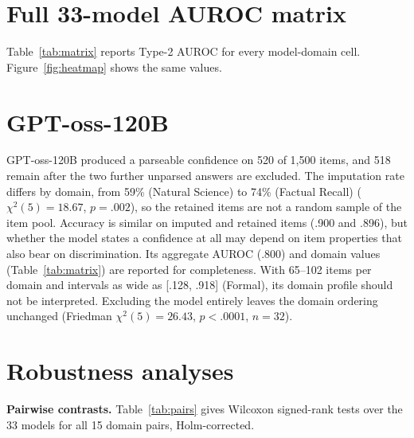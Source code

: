 \section{Full 33-model AUROC matrix}
\label{app:matrix}

Table~\ref{tab:matrix} reports Type-2 AUROC for every model-domain cell. Figure~\ref{fig:heatmap} shows the same values.



\section{GPT-oss-120B}
\label{app:gptoss}

GPT-oss-120B produced a parseable confidence on 520 of 1{,}500 items, and 518 remain after the two further unparsed answers are excluded. The imputation rate differs by domain, from 59\% (Natural Science) to 74\% (Factual Recall) ($\chi^2(5) = 18.67$, $p = .002$), so the retained items are not a random sample of the item pool. Accuracy is similar on imputed and retained items (.900 and .896), but whether the model states a confidence at all may depend on item properties that also bear on discrimination. Its aggregate AUROC (.800) and domain values (Table~\ref{tab:matrix}) are reported for completeness. With 65--102 items per domain and intervals as wide as [.128, .918] (Formal), its domain profile should not be interpreted. Excluding the model entirely leaves the domain ordering unchanged (Friedman $\chi^2(5) = 26.43$, $p < .0001$, $n = 32$).

\section{Robustness analyses}
\label{app:robust}

\textbf{Pairwise contrasts.} Table~\ref{tab:pairs} gives Wilcoxon signed-rank tests over the 33 models for all 15 domain pairs, Holm-corrected.

